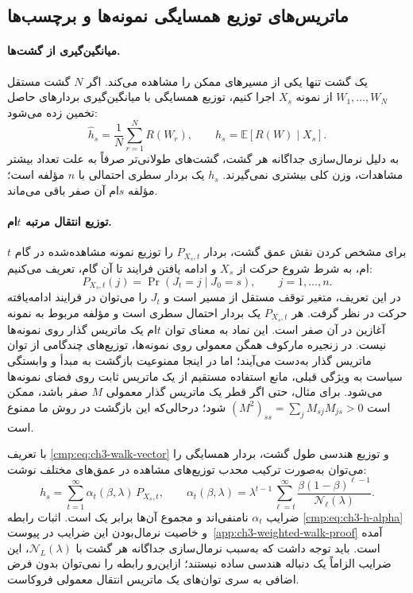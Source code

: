 \subsection{ماتریس‌های توزیع همسایگی نمونه‌ها و برچسب‌ها}
\label{cmp:subsec:ch3-representations}
\paragraph{میانگین‌گیری از گشت‌ها.}
یک گشت تنها یکی از مسیرهای ممکن را مشاهده می‌کند. اگر $N$ گشت مستقل $W_1,\ldots,W_N$ از نمونه $X_s$ اجرا کنیم، توزیع همسایگی با میانگین‌گیری بردارهای حاصل تخمین زده می‌شود:
\begin{equation}\label{cmp:eq:ch3-h-estimate}
\widehat h_s=\frac{1}{N}\sum_{r=1}^{N}R(W_r),
\qquad h_s=\mathbb E[R(W)\mid X_s].
\end{equation}
به دلیل نرمال‌سازی جداگانه هر گشت، گشت‌های طولانی‌تر صرفاً به علت تعداد بیشتر مشاهدات، وزن کلی بیشتری نمی‌گیرند. $h_s$ یک بردار سطری احتمالی با $n$ مؤلفه است؛ مؤلفه $s$ام آن صفر باقی می‌ماند.

\paragraph{توزیع انتقال مرتبه $t$ام.}
برای مشخص کردن نقش عمق گشت، بردار $P_{X_s,t}$ را توزیع نمونه مشاهده‌شده در گام $t$ام، به شرط شروع حرکت از $X_s$ و ادامه یافتن فرایند تا آن گام، تعریف می‌کنیم:
\begin{equation}\label{cmp:eq:ch3-step-observation-distribution}
P_{X_s,t}(j)=\Pr(J_t=j\mid J_0=s),
\qquad j=1,\ldots,n.
\end{equation}
در این تعریف، متغیر توقف مستقل از مسیر است و $J_t$ را می‌توان در فرایند ادامه‌یافته حرکت در نظر گرفت. هر $P_{X_s,t}$ یک بردار احتمال سطری است و مؤلفه مربوط به نمونه آغازین در آن صفر است. این نماد به معنای توان $t$ام یک ماتریس گذار روی نمونه‌ها نیست. در زنجیره مارکوف همگن معمولی روی نمونه‌ها، توزیع‌های چندگامی از توان ماتریس گذار به‌دست می‌آیند؛ اما در اینجا ممنوعیت بازگشت به مبدأ و وابستگی سیاست به ویژگی قبلی، مانع استفاده مستقیم از یک ماتریس ثابت روی فضای نمونه‌ها می‌شود. برای مثال، حتی اگر قطر یک ماتریس گذار معمولی $M$ صفر باشد، ممکن است $(M^2)_{ss}=\sum_jM_{sj}M_{js}>0$ شود؛ درحالی‌که این بازگشت در روش ما ممنوع است.

با تعریف \eqref{cmp:eq:ch3-walk-vector} و توزیع هندسی طول گشت، بردار همسایگی را می‌توان به‌صورت ترکیب محدب توزیع‌های مشاهده در عمق‌های مختلف نوشت:
\begin{equation}\label{cmp:eq:ch3-h-alpha}
\boxed{\displaystyle
h_s=\sum_{t=1}^{\infty}\alpha_t(\beta,\lambda)\,P_{X_s,t},
\qquad
\alpha_t(\beta,\lambda)=\lambda^{t-1}
\sum_{\ell=t}^{\infty}
\frac{\beta(1-\beta)^{\ell-1}}{\mathcal N_\ell(\lambda)}.}
\end{equation}
ضرایب $\alpha_t$ نامنفی‌اند و مجموع آن‌ها برابر یک است. اثبات رابطه \eqref{cmp:eq:ch3-h-alpha} و خاصیت نرمال‌بودن این ضرایب در پیوست~\ref{app:ch3-weighted-walk-proof} آمده است. باید توجه داشت که به‌سبب نرمال‌سازی جداگانه هر گشت با $\mathcal N_L(\lambda)$، این ضرایب الزاماً یک دنباله هندسی ساده نیستند؛ ازاین‌رو رابطه را نمی‌توان بدون فرض اضافی به سری توان‌های یک ماتریس انتقال معمولی فروکاست.


